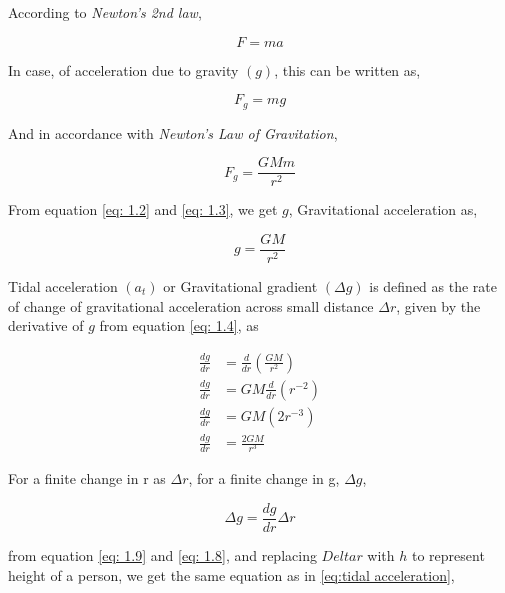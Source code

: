 \documentclass[9pt,a4paper,twocolumn,twoside]{tau-class/tau}
\begin{document}
  According to \emph{Newton's 2nd law},

  \begin{equation} \label{eq: 1.1}
    F = ma \tag{1.1}
  \end{equation}

  In case, of acceleration due to gravity \((g)\), this can be written as, 

  \begin{equation} \label{eq: 1.2}
    F_g = mg \tag{1.2}
  \end{equation}
  
  And in accordance with \emph{Newton's Law of Gravitation}, 

  \begin{equation} \label{eq: 1.3}
    F_g = \frac{GMm}{r^2} \tag{1.3}
  \end{equation}

  From equation \eqref{eq: 1.2} and \eqref{eq: 1.3}, we get \(g\), Gravitational acceleration as, 

  \begin{equation} \label{eq: 1.4}
    g = \frac{GM}{r^2} \tag{1.4}
  \end{equation}

  Tidal acceleration \((a_t)\) or Gravitational gradient \((\Delta g)\) is defined as the rate of change of gravitational acceleration across small distance \(\Delta r\), given by the derivative of \(g\) from equation \eqref{eq: 1.4}, as

  \begin{align} \label{eq: 1.8}
     \frac{dg}{dr} &= \frac{d}{dr} (\frac{GM}{r^2}) \tag{1.5}\\
     \frac{dg}{dr} &= GM\frac{d}{dr} (r^{-2}) \tag{1.6}\\
     \frac{dg}{dr} &= GM (2 r^{-3}) \tag{1.7}\\
     \frac{dg}{dr} &= \frac{2GM}{r^{3}} \tag{1.8}
  \end{align}
  
 For a finite change in r as \(\Delta r\), for a finite change in g, \(\Delta g\),

  \begin{equation} \label{eq: 1.9}
    \Delta g = \frac{dg}{dr} \Delta r \tag{1.9}
  \end{equation}
 
  from equation \eqref{eq: 1.9} and \eqref{eq: 1.8}, and replacing \(Delta r\) with \(h\) to represent height of a person, we get the same equation as in \eqref{eq:tidal acceleration}, 
\end{document}
